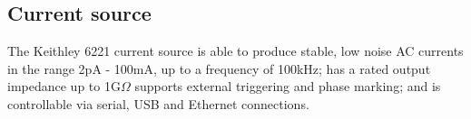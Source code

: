 \subsection{Current source}

The Keithley 6221 current source is able to produce stable, low noise AC currents in the range 2pA - 100mA, up to a frequency of 100kHz; has a rated output impedance up to 1G\(\Omega\) supports external triggering and phase marking; and is controllable via serial, USB and Ethernet connections.